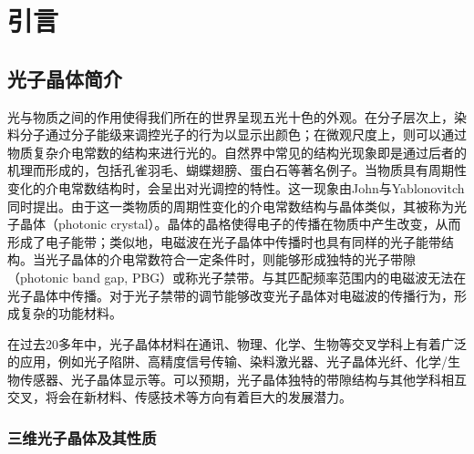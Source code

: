 
\chapter{引言}
\label{ch:intro}

\section{光子晶体简介}
\label{sec:intro_PhC}

光与物质之间的作用使得我们所在的世界呈现五光十色的外观。在分子层次上，染料分子通过分子能级来调控光子的行为以显示出颜色；在微观尺度上，则可以通过物质复杂介电常数的结构来进行光的。自然界中常见的结构光现象即是通过后者的机理而形成的\cite{Ball2012NatureS}，包括孔雀羽毛、蝴蝶翅膀、蛋白石等著名例子。当物质具有周期性变化的介电常数结构时，会呈出对光调控的特性。这一现象由John与Yablonovitch同时提出\cite{John1987Strong,Yablonovitch1987Inhibited}。由于这一类物质的周期性变化的介电常数结构与晶体类似，其被称为光子晶体（photonic crystal）。晶体的晶格使得电子的传播在物质中产生改变，从而形成了电子能带；类似地，电磁波在光子晶体中传播时也具有同样的光子能带结构。当光子晶体的介电常数符合一定条件时，则能够形成独特的光子带隙（photonic band gap, PBG）或称光子禁带。与其匹配频率范围内的电磁波无法在光子晶体中传播。对于光子禁带的调节能够改变光子晶体对电磁波的传播行为，形成复杂的功能材料。

在过去20多年中，光子晶体材料在通讯、物理、化学、生物等交叉学科上有着广泛的应用，例如光子陷阱\cite{Baba2008Slow}、高精度信号传输\cite{Adawi2010Optical}、染料激光器\cite{Scofield2011BottomUpa}、光子晶体光纤\cite{Consales2012LabOnFiber,Wang2013FiberOptic}、化学/生物传感器\cite{Zhao2010Photonic}、光子晶体显示\cite{Arsenault2007PhotonicCrystal}等。可以预期，光子晶体独特的带隙结构与其他学科相互交叉，将会在新材料、传感技术等方向有着巨大的发展潜力。

\subsection{三维光子晶体及其性质}
\label{subsec:3DPhC}

